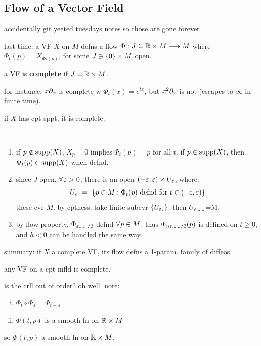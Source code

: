 \subsection{Flow of a Vector Field}
accidentally git yeeted tuesdays notes so those are gone forever

last time: a VF $X$ on $M$ defns a flow $\Phi:J\subseteq\mathbb{R}\times M\longrightarrow M$ where $\dot{\Phi}_{t}(p)=X_{\Phi_{t}(p)}$,
for some $J\ni\left\{{0}\right\}\times M$ open.

\begin{defn}
	a VF is \textbf{complete} if $J=\mathbb{R}\times M$.
\end{defn}
for instance, $x\partial_{x}$ is complete w $\Phi_{t}(x)=e^{tx}$, but
$x^{2}\partial_{x}$ is not (escapes to $\infty$ in finite time).

\begin{thm}
	if $X$ has cpt sppt, it is complete.
\end{thm} \

\begin{pf} \vspace{-0.2in}
	\begin{enumerate}[1)]
		\item if $p\notin\operatorname{supp}(X)$, $X_{p}=0$ implies $\Phi_{t}(p)=p$ for all $t$.
			if $p\in\operatorname{supp}(X)$, then $\Phi_{t}(p)\in\operatorname{supp}(X)$ when defnd.
		\item since $J$ open, $\fa\ep>0$, there is an open $(-\varepsilon,\varepsilon)\times U_{\varepsilon}$, where:
			\begin{equation*}
				U_{\varepsilon} \ = \ \left\{{p\in M:\Phi_{t}(p) \textrm{ defnd for } t \in (-\varepsilon,\varepsilon)}\right\}
			\end{equation*}
			these cvr $M$. by cptness, take finite subcvr $\left\{{U_{\varepsilon_{i}}}\right\}$.
			then $U_{\varepsilon_{\min}}$=M.
		\item by flow property, $\Phi_{\varepsilon_{\min}/2}$ defnd $\fa p\in M$.
			thus $\Phi_{n\varepsilon_{\min}/2}(p)$ is defined on $t\geq0$,
			and $h<0$ can be handled the same way.
	\end{enumerate}
\end{pf}
summary: if $X$ a complete VF, its flow defns a 1-param. family of diffeos.

\begin{crll}
	any VF on a cpt mfld is complete.
\end{crll}
is the crll out of order? oh well. note:
\begin{enumerate}[i)]
	\item $\Phi_{t}\circ\Phi_{s}=\Phi_{t+s}$
	\item $\Phi(t,p)$ is a smooth fn on $\mathbb{R}\times M$
\end{enumerate}
so $\Phi(t,p)$ a smooth fn on $\mathbb{R}\times M$.

